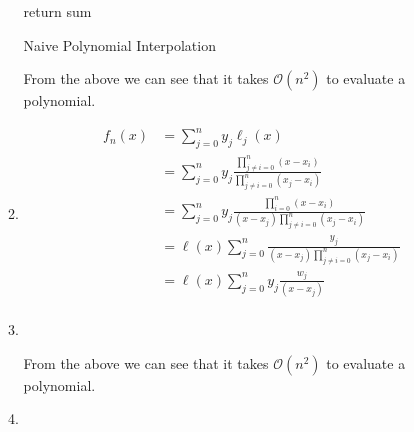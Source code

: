 \documentclass{report}
\begin{document}
\begin{solution}
\begin{enumerate}[label=(\alph*)]
\begin{enumerate}[label=(\roman*)]
\begin{algorithm}[H]
{{					            }
					            return sum
					            \caption{Naive Polynomial Interpolation}
				            }
			            \end{algorithm}
			            From the above we can see that it takes $\mathcal{O}\left( n^2 \right) $ to evaluate a polynomial.
			      \item \begin{align*}
				            f_{n}(x) & = \sum_{j=0}^{n} y_j \ell_j(x) \\
				                     & = \sum_{j=0}^{n} y_j \frac{\prod_{j\neq i=0}^n (x-x_{i})}{\prod_{j\neq i=0}^n (x_{j}-x_{i})} \\
				                     & = \sum_{j=0}^{n} y_j \frac{\prod_{i=0}^n (x-x_{i})}{(x-x_{j})\prod_{j\neq i=0}^n (x_{j}-x_{i})} \\
				                     & = \ell(x) \sum_{j=0}^{n} \frac{y_j}{(x-x_{j})\prod_{j\neq i=0}^n (x_{j}-x_{i})} \\
				                     & = \ell(x) \sum_{j=0}^{n} y_j \frac{w_j}{(x-x_{j})} \\
			            \end{align*}
			      \item  	\phantom{}\\
			            \begin{algorithm}[H]
			            \end{algorithm}
			            From the above we can see that it takes $\mathcal{O}\left( n^2 \right) $ to evaluate a polynomial.
			      \item
		      \end{enumerate}
	\end{enumerate}
\end{solution}
\end{document}
